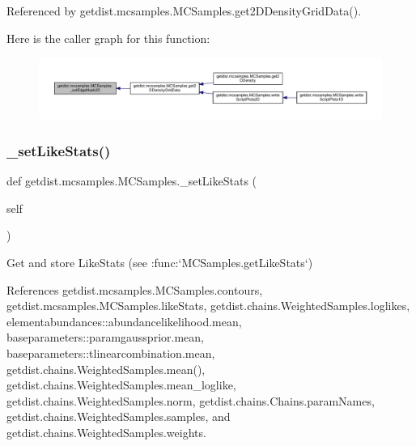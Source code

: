 Referenced by getdist.\+mcsamples.\+M\+C\+Samples.\+get2\+D\+Density\+Grid\+Data().

Here is the caller graph for this function\+:
\nopagebreak
\begin{figure}[H]
\begin{center}
\leavevmode
\includegraphics[width=350pt]{classgetdist_1_1mcsamples_1_1MCSamples_ad01cbb023ef1ede5d50f0f81439146a8_icgraph}
\end{center}
\end{figure}
\mbox{\label{classgetdist_1_1mcsamples_1_1MCSamples_a9c6887c5c7470e1f684082b0c07f5169}} 
\subsubsection{\texorpdfstring{\+\_\+set\+Like\+Stats()}{\_setLikeStats()}}
{\footnotesize\ttfamily def getdist.\+mcsamples.\+M\+C\+Samples.\+\_\+set\+Like\+Stats (\begin{DoxyParamCaption}\item[{}]{self }\end{DoxyParamCaption})\hspace{0.3cm}{\ttfamily [private]}}

\begin{DoxyVerb}Get and store LikeStats (see :func:`MCSamples.getLikeStats`)
\end{DoxyVerb}
 

References getdist.\+mcsamples.\+M\+C\+Samples.\+contours, getdist.\+mcsamples.\+M\+C\+Samples.\+like\+Stats, getdist.\+chains.\+Weighted\+Samples.\+loglikes, elementabundances\+::abundancelikelihood.\+mean, baseparameters\+::paramgaussprior.\+mean, baseparameters\+::tlinearcombination.\+mean, getdist.\+chains.\+Weighted\+Samples.\+mean(), getdist.\+chains.\+Weighted\+Samples.\+mean\+\_\+loglike, getdist.\+chains.\+Weighted\+Samples.\+norm, getdist.\+chains.\+Chains.\+param\+Names, getdist.\+chains.\+Weighted\+Samples.\+samples, and getdist.\+chains.\+Weighted\+Samples.\+weights.



